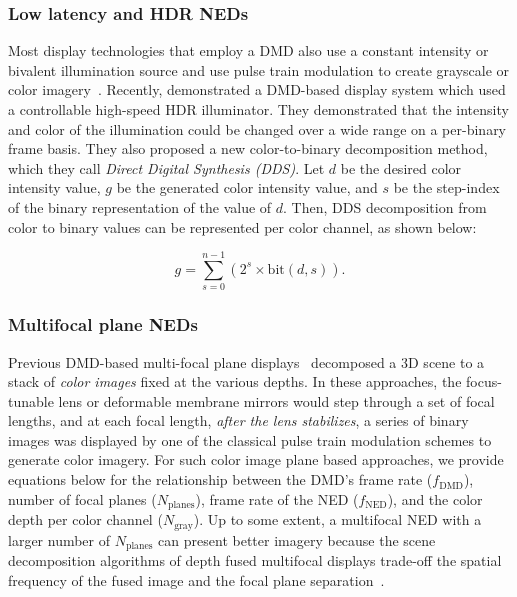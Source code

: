 \subsubsection{Low latency and HDR NEDs}
Most display technologies that employ a DMD also use a constant intensity or bivalent illumination source and use pulse train modulation to create grayscale or color imagery~\cite{Lincoln2016motion}. Recently, \citet{Lincoln2017scene} demonstrated a DMD-based display system which used a controllable high-speed HDR illuminator. They demonstrated that the intensity and color of the illumination could be changed over a wide range on a per-binary frame basis. They also proposed a new color-to-binary decomposition method, which they call \emph{Direct Digital Synthesis (DDS)}. Let $d$ be the desired color intensity value, $g$ be the generated color intensity value, and $s$ be the step-index of the binary representation of the value of $d$. Then, DDS decomposition from color to binary values can be represented per color channel, as shown below: 

\begin{equation}
g = \sum_{s = 0}^{n-1} \left(2^s \times \text{bit}(d,s)\right).
\end{equation}

\subsubsection{Multifocal plane NEDs}
Previous DMD-based multi-focal plane displays~\cite{Hu2014design,Hu2015Design} decomposed a 3D scene to a stack of \emph{color images} fixed at the various depths. In these approaches, the focus-tunable lens or deformable membrane mirrors would step through a set of focal lengths, and at each focal length, \emph{after the lens stabilizes}, a series of binary images was displayed by one of the classical pulse train modulation schemes to generate color imagery. For such color image plane based approaches, we provide equations below for the relationship between the DMD's frame rate ($f_{\text{DMD}}$), number of focal planes ($N_{\text{planes}}$), frame rate of the NED ($f_{\text{NED}}$), and the color depth per color channel ($N_{\text{gray}}$). Up to some extent, a multifocal NED with a larger number of $N_{\text{planes}}$ can present better imagery because the scene decomposition algorithms of depth fused multifocal displays trade-off the spatial frequency of the fused image and the focal plane separation~\cite{Hu2014design,Hua2017Enabling}. 

